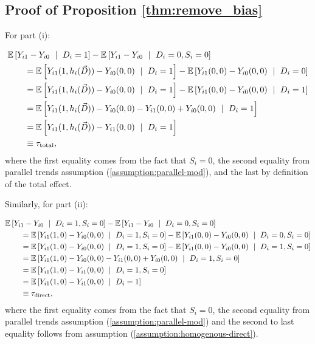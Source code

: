 \documentclass[11pt]{article}
\begin{document}
\subsection{Proof of Proposition \ref{thm:remove_bias}}

For part (i):

\begin{align*}
    &\expec{Y_{i1} - Y_{i0} \ \mid \ D_i = 1} - \expec{Y_{i1} - Y_{i0} \ \mid \ D_i = 0, S_i = 0} \\
    &\quad\quad= \expec{Y_{i1}(1, h_i(\vec{D})) - Y_{i0}(0,0) \ \mid \ D_i = 1} - \expec{Y_{i1}(0, 0) - Y_{i0}(0,0) \ \mid \ D_i = 0} \\
    &\quad\quad= \expec{Y_{i1}(1, h_i(\vec{D})) - Y_{i0}(0,0) \ \mid \ D_i = 1} - \expec{Y_{i1}(0, 0) - Y_{i0}(0,0) \ \mid \ D_i = 1} \\
    &\quad\quad= \expec{Y_{i1}(1, h_i(\vec{D})) - Y_{i0}(0,0) - Y_{i1}(0, 0) + Y_{i0}(0,0) \ \mid \ D_i = 1} \\
    &\quad\quad= \expec{Y_{i1}(1, h_i(\vec{D})) - Y_{i1}(0, 0) \ \mid \ D_i = 1} \\
    &\quad\quad\equiv \tau_{\text{total}},
\end{align*}
where the first equality comes from the fact that $S_i = 0$, the second equality from parallel trends assumption (\ref{assumption:parallel-mod}), and the last by definition of the total effect.

Similarly, for part (ii):

\begin{align*}
    &\mathbb{E}\left[Y_{i1} - Y_{i0} \ \mid \ D_i = 1, S_i = 0\right] - \mathbb{E}\left[Y_{i1} - Y_{i0} \ \mid \ D_i = 0, S_i = 0\right] \\
    &\quad\quad= \mathbb{E}\left[Y_{i1}(1, 0) - Y_{i0}(0,0) \ \mid \ D_i = 1, S_i = 0\right] - \mathbb{E}\left[Y_{i1}(0, 0) - Y_{i0}(0,0) \ \mid \ D_i = 0, S_i = 0\right] \\
    &\quad\quad= \mathbb{E}\left[Y_{i1}(1, 0) - Y_{i0}(0,0) \ \mid \ D_i = 1, S_i = 0\right] - \mathbb{E}\left[Y_{i1}(0, 0) - Y_{i0}(0,0) \ \mid \ D_i = 1, S_i = 0\right] \\
    &\quad\quad= \mathbb{E}\left[Y_{i1}(1, 0) - Y_{i0}(0,0) - Y_{i1}(0, 0) + Y_{i0}(0,0) \ \mid \ D_i = 1, S_i = 0\right] \\
    &\quad\quad= \mathbb{E}\left[Y_{i1}(1, 0) - Y_{i1}(0, 0) \ \mid \ D_i = 1, S_i = 0\right] \\
    &\quad\quad= \mathbb{E}\left[Y_{i1}(1, 0) - Y_{i1}(0, 0) \ \mid \ D_i = 1\right] \\
    &\quad\quad\equiv \tau_{\text{direct}},
\end{align*}
where the first equality comes from the fact that $S_i = 0$, the second equality from parallel trends assumption (\ref{assumption:parallel-mod}) and 
the second to last equality follows from assumption (\ref{assumption:homogenous-direct}).
\end{document}
